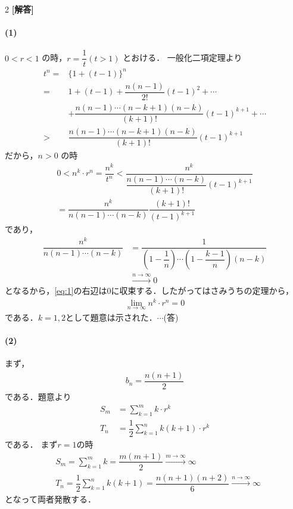 \documentclass[../../main.tex]{subfiles}
\begin{document}
\setcounter{equation}{0}
\setcounter{figure}{0}
\setcounter{table}{0}
\begin{oframed}
  
\end{oframed}
\setlength{\columnseprule}{0.4pt}
\begin{multicols}{2}
  {\bf [解答]}

  \paragraph{(1)}
  $0 < r < 1$ の時，$r = \dfrac{1}{t} (t>1)$ とおける．
  一般化二項定理より
  \begin{align}
    t^n
    = & \{1+(t-1)\}^n                                  \\
    = & 1 + (t-1) + \dfrac{n(n-1)}{2!}(t-1)^2+\cdots    \\
    & +\dfrac{n(n-1)\cdots(n-k+1)(n-k)}{(k+1)!}(t-1)^{k+1} +\cdots \\
    > & \dfrac{n(n-1)\cdots(n-k+1)(n-k)}{(k+1)!}(t-1)^{k+1}
  \end{align}
  だから，$n > 0$ の時
  \begin{align}
    0 < n^k \cdot r^n = \dfrac{n^k}{t^n}
    < \dfrac{n^k}{\dfrac{n(n-1)\cdots(n-k)}{(k+1)!}(t-1)^{k+1}} \nonumber \\
    = \dfrac{n^k}{n(n-1)\cdots(n-k)}\dfrac{(k+1)!}{(t-1)^{k+1}}\label{eq:1}
  \end{align}
  であり，
  \begin{align}
    \dfrac{n^k }{n(n-1)\cdots(n-k)}
    & = \dfrac{1}{\left(1-\dfrac{1}{n}\right)\cdots\left(1-\dfrac{k-1}{n}\right)(n-k) }  \\
    & \xrightarrow{n\to\infty} 0
  \end{align}
  となるから，\cref{eq:1}の右辺は$0$に収束する．したがってはさみうちの定理から，
  \begin{align}
    \lim_{n\to\infty} n^k \cdot r^n = 0
  \end{align}
  である．$k=1,2$として題意は示された．$\cdots$(答)

  \paragraph{(2)}
  まず，
  \begin{align}
    b_n = \dfrac{n(n+1)}{2}
  \end{align}
  である．題意より
  \begin{align}
    S_m & = \sum_{k=1}^m k \cdot r^k                 \\
    T_n & = \dfrac{1}{2}\sum_{k=1}^n k(k+1) \cdot r^k
  \end{align}
  である．
  まず$r=1$の時
  \begin{align}
    & S_m = \sum_{k=1}^m k = \dfrac{m(m+1)}{2} \xrightarrow{m\to\infty} \infty \\
    & T_n = \dfrac{1}{2}\sum_{k=1}^n k(k+1) = \dfrac{n(n+1)(n+2)}{6} \xrightarrow{n\to\infty} \infty
  \end{align}
  となって両者発散する．


\end{multicols}
\end{document}
